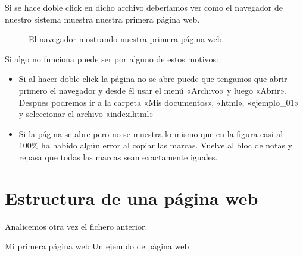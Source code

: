 \documentclass[a4paper,12pt,spanish]{sphinxmanual}
\begin{document}
Si se hace doble click en dicho archivo deberíamos ver como el navegador de nuestro sistema muestra nuestra primera página web.

\begin{figure}[htbp]
\centering
\capstart

\noindent{}
\caption{El navegador mostrando nuestra primera página web.}\label{\detokenize{index:id7}}\end{figure}

Si algo no funciona puede ser por alguno de estos motivos:
\begin{itemize}
\item {} 
Si al hacer doble click la página no se abre puede que tengamos que abrir primero el navegador y desde él usar el menú «Archivo» y luego «Abrir». Despues podremos ir a la carpeta «Mis documentos», «html», «ejemplo\_01» y seleccionar el archivo «index.html»

\item {} 
Si la página se abre pero no se muestra lo mismo que en la figura casi al 100\% ha habido algún error al copiar las marcas. Vuelve al bloc de notas y repasa que todas las marcas sean exactamente iguales.

\end{itemize}


\chapter{Estructura de una página web}
\label{\detokenize{index:estructura-de-una-pagina-web}}
Analicemos otra vez el fichero anterior.

%
\begin{sphinxVerbatim}[commandchars=\\\{\}]
         Mi primera página web
     Un ejemplo de página web
\end{sphinxVerbatim}
\end{document}
